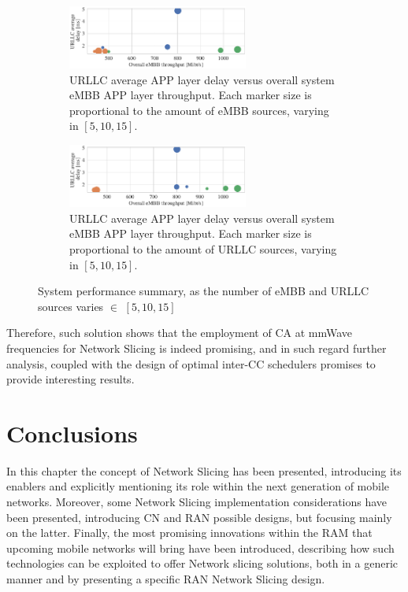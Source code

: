 \documentclass[11pt]{book}
\begin{document}
\begin{figure}[t]
  \centering
  \begin{subfigure}[t]{\columnwidth}
    \centering
      \setlength\belowcaptionskip{.1cm}
    \includegraphics[width=0.65\textwidth]{figures/Throughput_vs_delay_numEmbbUes.pdf}
    \caption{URLLC average APP layer delay versus overall system eMBB APP layer throughput.  Each marker size is proportional to the amount of eMBB sources, varying in $[5, 10, 15]$.}
    \label{fig:PerfNumEmbb}
  \end{subfigure}
  \begin{subfigure}[t]{\columnwidth}
    \centering
    \includegraphics[width=0.65\textwidth]{figures/Throughput_vs_delay_numUrllcUes.pdf}
    \caption{URLLC average APP layer delay versus overall system eMBB APP layer throughput.  Each marker size is proportional to the amount of URLLC sources, varying in $[5, 10, 15]$.}
    \label{fig:PerfNumUrllc}
  \end{subfigure}
  \setlength\belowcaptionskip{-.5cm}
  \caption{System performance summary, as the number of eMBB and URLLC sources varies $\in$ $[5, 10, 15]$}
  \label{fig:Perf}
\end{figure}
Therefore, such solution shows that the employment of CA at mmWave frequencies for Network Slicing is indeed promising, and in such regard further analysis, coupled with the design of optimal inter-CC schedulers promises to provide interesting results.

\section{Conclusions}
In this chapter the concept of Network Slicing has been presented, introducing its enablers and explicitly mentioning its role within the next generation of mobile networks. Moreover, some Network Slicing implementation considerations have been presented, introducing CN and RAN possible designs, but focusing mainly on the latter. Finally, the most promising innovations within the RAM that upcoming mobile networks will bring have been introduced, describing how such technologies can be exploited to offer Network slicing solutions, both in a generic manner and by presenting a specific RAN Network Slicing design.





\printbibliography
\end{document}
